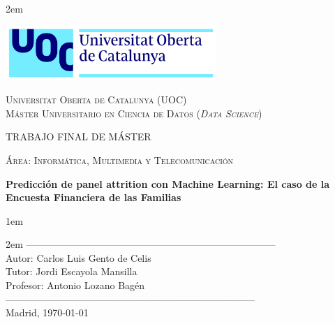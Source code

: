 \newpage
\thispagestyle{empty}

\baselineskip 2em


\centerline{\includegraphics[width=0.6\textwidth]{images/UOC-logo}}
\begin{center}
\textsc{Universitat Oberta de Catalunya (UOC) \\
 Máster Universitario en Ciencia de Datos (\textit{Data Science})\\}


\vspace*{1.5cm}

\textsc{\Large TRABAJO FINAL DE MÁSTER}

\vspace*{0.5cm}

\textsc{\large Área: Informática, Multimedia y Telecomunicación}



\vspace*{2.0cm}

\textbf{\Large Predicción de panel attrition con Machine Learning: El caso de la Encuesta Financiera de las Familias}

\textbf{\large }

\vspace{2.5cm}
\baselineskip 1em

\baselineskip 2em
-----------------------------------------------------------------------------\\
Autor:      Carlos Luis Gento de Celis\\
Tutor:      Jordi Escayola Mansilla\\
Profesor:   Antonio Lozano Bagén\\
-----------------------------------------------------------------------------\\
\vspace*{1.5cm}
Madrid, \today

\end{center}

\newpage
\pagestyle{empty}
\hfill
